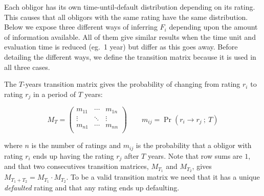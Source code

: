 \documentclass[11pt,fleqn]{book} %
\begin{document}
Each obligor has its own time-until-default distribution depending on its 
rating. This causes that all obligors with the same rating have the same 
distribution. Below we expose three different ways of inferring $F_i$ 
depending upon the amount of information available. All of them give similar 
results when the time unit and evaluation time is reduced (eg.\ 1 year) but 
differ as this goes away. Before detailing the different ways, we define the 
transition matrix because it is used in all three cases.

\begin{definition}
	\label{def:tm}
	The $T$-years transition matrix gives the probability of changing 
	from rating $r_i$ to rating $r_j$ in a period of $T$ years:
	{\small
	\begin{displaymath}
		M_T = \left(
		\begin{array}{ccc}
			m_{11} & \cdots & m_{1n} \\
			\vdots & \ddots & \vdots \\
			m_{n1} & \cdots & m_{nn} \\
		\end{array}
		\right)
		\qquad
		m_{ij} = \Pr(r_i \to r_j\ ;\ T)
	\end{displaymath}\par}
	where $n$ is the number of ratings and $m_{ij}$ is the probability that a
	obligor with rating $r_i$ ends up having the rating $r_j$ after $T$ years.
	Note that row sums are $1$, and that two consecutives transition matrices, 
	$M_{T_1}$ and $M_{T_2}$, gives $M_{T_1+T_2} = M_{T_1} \cdot M_{T_2}$.
	To be a valid transition matrix we need that it has a unique \emph{defaulted}
	rating and that any rating ends up defaulting.
\end{definition}
\end{document}
